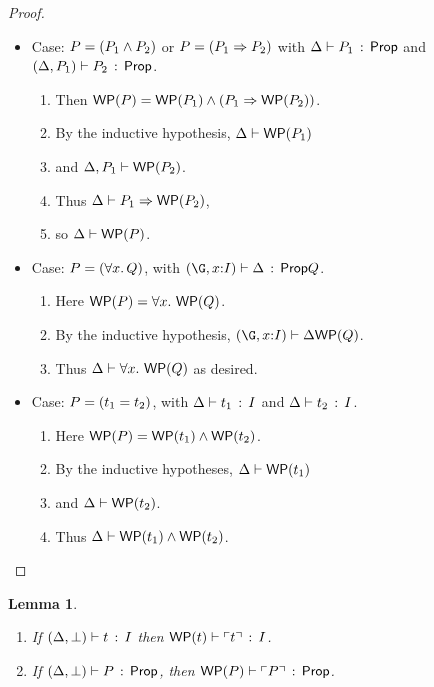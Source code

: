 \documentclass[10pt,letter]{article}
\newtheorem{lemma}[theorem]{Lemma}
\begin{document}
\begin{proof}
\begin{itemize}
  \item Case: $P = (P_1 \wedge P_2)$ or $P = (P_1 \Rightarrow P_2)$ with
       $\Delta \vdash P_1\, :\, \mathsf{Prop}$ and 
              $(\Delta,P_1) \vdash P_2\, :\, \mathsf{Prop}$.
       \begin{enumerate}
       \item Then $\mathop{\mathsf{WP}}(P) = \mathop{\mathsf{WP}}(P_1) \wedge (P_1 \Rightarrow \mathop{\mathsf{WP}}(P_2))$.
       \item By the inductive hypothesis,
         $\Delta \vdash \mathop{\mathsf{WP}}(P_1)$
       \item 
         and $\Delta,P_1 \vdash \mathop{\mathsf{WP}}(P_2)$.
       \item 
         Thus $\Delta \vdash P_1 \Rightarrow \mathop{\mathsf{WP}}(P_2)$,
       \item
         so $\Delta \vdash \mathop{\mathsf{WP}}(P)$.    
       \end{enumerate}
  \item Case: $P=(\forall x.\, Q)$, 
        with $\jwfprop{(\G,\x{:}\I)}{\D}{\q}$.
  	\begin{enumerate}
	\item 
		Here $\mathop{\mathsf{WP}}(P) = \forall x.\, \mathop{\mathsf{WP}}(Q)$.
	\item 
		By the inductive hypothesis,
	   $\jpf{(\G,\x{:}\I)}{\D}{\wp{\q}}$.
	\item 
		Thus
	   $\Delta \vdash \forall x.\, \mathop{\mathsf{WP}}(Q)$ as desired.
	\end{enumerate}
  \item Case: $P = (t_1 = t_2)$, with $\Delta \vdash t_1\, :\, I$ and $\Delta \vdash t_2\, :\, I$. 
    	\begin{enumerate}
	\item 
		Here $\mathop{\mathsf{WP}}(P) = \mathop{\mathsf{WP}}(t_1) \wedge \mathop{\mathsf{WP}}(t_2)$.
	\item 
		By the inductive hypotheses,
		$\Delta \vdash \mathop{\mathsf{WP}}(t_1)$ 
	\item 
		and $\Delta \vdash \mathop{\mathsf{WP}}(t_2)$.
	\item
		Thus $\Delta \vdash \mathop{\mathsf{WP}}(t_1) \wedge \mathop{\mathsf{WP}}(t_2)$.
	\end{enumerate}       
  \end{itemize}
\end{proof}

\clearpage

\begin{lemma}
\label{lemma:l9}
\mbox{}
  \begin{enumerate}
  \item If $(\Delta,\bot) \vdash t\, :\, I$ then
    $\mathop{\mathsf{WP}}(t) \vdash \ulcorner t \urcorner\, :\, I$.
  \item If $(\Delta,\bot) \vdash P\, :\, \mathsf{Prop}$, then
    $\mathop{\mathsf{WP}}(P) \vdash \ulcorner P \urcorner\, :\, \mathsf{Prop}$.
  \end{enumerate}
\end{lemma}
\end{document}
